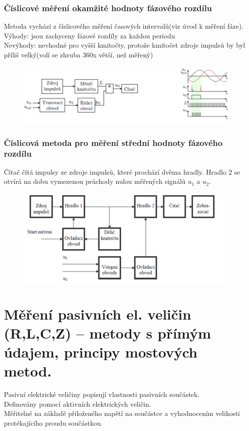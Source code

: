 \subsubsection*{Číslicové měření okamžité hodnoty fázového rozdílu}
Metoda vychází z číslicového měření časových intervalů(viz úvod k měření fáze).\\
Výhody: jsou zachyceny fázové rozdíly za každou periodu\\
Nevýhody: nevhodné pro vyšší kmitočty, protože kmitočet zdroje impulsů by byl příliš velký(volí se zhruba 360x větší, než měřený)
\begin{figure}[H]
    \includegraphics*[scale = 1]{images/fazeCislicovaOkamzita.png}
\end{figure}

\subsubsection*{Číslicová metoda pro měření střední hodnoty fázového rozdílu}
Čítač čítá impulsy ze zdroje impulsů, které prochází dvěma hradly. Hradlo 2 se otvírá na dobu vymezenou průchody nulou měřených signálů $u_1$ a $u_2$.
\begin{figure}[H]
    \includegraphics*[scale = 1]{images/fazeCislicovaStredni.png}
\end{figure}



\section{Měření pasivních el. veličin (R,L,C,Z) – metody s přímým údajem, principy mostových metod.}
Pasivní elektrické veličiny popisují vlastnosti pasivních součástek.\\
Definovány pomocí aktivních elektrických veličin.\\
Měřitelné na základě přiloženého napětí na součástce a vyhodnocením velikosti protékajícího proudu součástkou.\\
